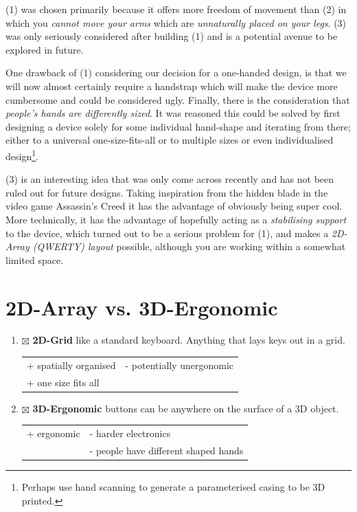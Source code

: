 \documentclass[logo,bsc,singlespacing,parskip]{infthesis}
\begin{document}
(1) was chosen primarily because it offers more freedom of movement than (2) in which you \emph{cannot move your arms} which are \emph{unnaturally placed on your legs}.
(3) was only seriously considered after building (1) and is a potential avenue to be explored in future.

One drawback of (1) considering our decision for a one-handed design, is that we will now almost certainly require a handstrap which will make the device more cumbersome and  could be considered ugly.
Finally, there is the consideration that \emph{people's hands are differently sized}.
It was reasoned this could be solved by first designing a device solely for some individual hand-shape and iterating from there; either to a universal one-size-fits-all or to multiple sizes or even individualised design\footnote{Perhaps use hand scanning to generate a parameterised casing to be 3D printed.}.

(3) is an interesting idea that was only come across recently and has not been ruled out for future designs.
Taking inspiration from the hidden blade in the video game Assassin's Creed it has the advantage of obviously being super cool.
More technically, it has the advantage of hopefully acting as a \emph{stabilising support} to the device, which turned out to be a serious problem for (1), and makes a \emph{2D-Array (QWERTY) layout} possible, although you are working within a somewhat limited space.
\section{2D-Array vs. 3D-Ergonomic}
\label{sec:org9716be3}
\begin{enumerate}
\item{$\boxtimes$} \textbf{2D-Grid} like a standard keyboard. Anything that lays keys out in a grid.
\begin{longtable}{|p{6.25cm}|p{6.25cm}|}
\hline
+ spatially organised & - potentially unergonomic\\
+ one size fits all & \\
\hline
\end{longtable}
\item{$\boxtimes$} \textbf{3D-Ergonomic} buttons can be anywhere on the surface of a 3D object.
\begin{longtable}{|p{6.25cm}|p{6.25cm}|}
\hline
+ ergonomic & - harder electronics\\
 & - people have different shaped hands\\
\hline
\end{longtable}
\end{enumerate}
\end{document}
